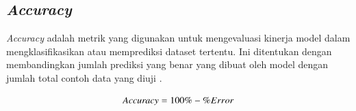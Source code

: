 \subsection{\emph{Accuracy}}
\label{subsec:cnn}

\emph{Accuracy} adalah metrik yang digunakan untuk mengevaluasi kinerja model dalam mengklasifikasikan atau memprediksi dataset tertentu. Ini ditentukan dengan membandingkan jumlah prediksi yang benar yang dibuat oleh model dengan jumlah total contoh data yang diuji \parencite{Deepthi}.

\begin{equation}
  \label{eq:KonversiPanjangLangkah}
  \emph{Accuracy} =  100\% - \%Error
\end{equation}